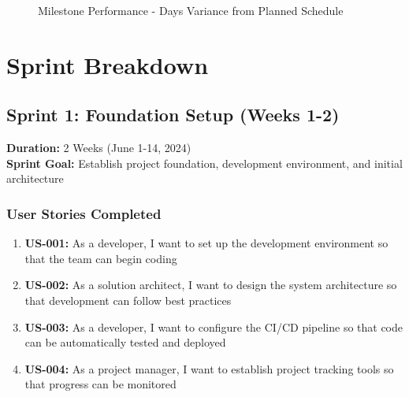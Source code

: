 \documentclass[12pt,a4paper]{article}
\begin{document}
\begin{figure}[H]
\centering
{}
\caption{Milestone Performance - Days Variance from Planned Schedule}
\label{fig:milestone-performance}
\end{figure}

\section{Sprint Breakdown}

\subsection{Sprint 1: Foundation Setup (Weeks 1-2)}
\textbf{Duration:} 2 Weeks (June 1-14, 2024) \\
\textbf{Sprint Goal:} Establish project foundation, development environment, and initial architecture

\subsubsection{User Stories Completed}
\begin{enumerate}
    \item \textbf{US-001:} As a developer, I want to set up the development environment so that the team can begin coding
    \item \textbf{US-002:} As a solution architect, I want to design the system architecture so that development can follow best practices
    \item \textbf{US-003:} As a developer, I want to configure the CI/CD pipeline so that code can be automatically tested and deployed
    \item \textbf{US-004:} As a project manager, I want to establish project tracking tools so that progress can be monitored
\end{enumerate}
\end{document}
